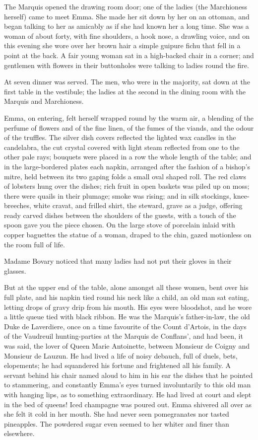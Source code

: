 \documentclass[11pt,twocolumn]{ltugboat}
\begin{document}
The Marquis opened the drawing room door; one of the ladies (the
Marchioness herself) came to meet Emma. She made her sit down by her on
an ottoman, and began talking to her as amicably as if she had known her
a long time. She was a woman of about forty, with fine shoulders, a hook
nose, a drawling voice, and on this evening she wore over her brown hair
a simple guipure fichu that fell in a point at the back. A fair young
woman sat in a high-backed chair in a corner; and gentlemen with flowers
in their buttonholes were talking to ladies round the fire.

At seven dinner was served. The men, who were in the majority, sat down
at the first table in the vestibule; the ladies at the second in the
dining room with the Marquis and Marchioness.

Emma, on entering, felt herself wrapped round by the warm air, a
blending of the perfume of flowers and of the fine linen, of the fumes
of the viands, and the odour of the truffles. The silver dish covers
reflected the lighted wax candles in the candelabra, the cut crystal
covered with light steam reflected from one to the other pale rays;
bouquets were placed in a row the whole length of the table; and in
the large-bordered plates each napkin, arranged after the fashion of a
bishop's mitre, held between its two gaping folds a small oval shaped
roll. The red claws of lobsters hung over the dishes; rich fruit in open
baskets was piled up on moss; there were quails in their plumage; smoke
was rising; and in silk stockings, knee-breeches, white cravat, and
frilled shirt, the steward, grave as a judge, offering ready carved
dishes between the shoulders of the guests, with a touch of the spoon
gave you the piece chosen. On the large stove of porcelain inlaid
with copper baguettes the statue of a woman, draped to the chin, gazed
motionless on the room full of life.

Madame Bovary noticed that many ladies had not put their gloves in their
glasses.

But at the upper end of the table, alone amongst all these women, bent
over his full plate, and his napkin tied round his neck like a child, an
old man sat eating, letting drops of gravy drip from his mouth. His eyes
were bloodshot, and he wore a little queue tied with black ribbon. He
was the Marquis's father-in-law, the old Duke de Laverdiere, once on
a time favourite of the Count d'Artois, in the days of the Vaudreuil
hunting-parties at the Marquis de Conflans', and had been, it was said,
the lover of Queen Marie Antoinette, between Monsieur de Coigny and
Monsieur de Lauzun. He had lived a life of noisy debauch, full of duels,
bets, elopements; he had squandered his fortune and frightened all his
family. A servant behind his chair named aloud to him in his ear the
dishes that he pointed to stammering, and constantly Emma's eyes
turned involuntarily to this old man with hanging lips, as to something
extraordinary. He had lived at court and slept in the bed of queens!
Iced champagne was poured out. Emma shivered all over as she felt
it cold in her mouth. She had never seen pomegranates nor tasted
pineapples. The powdered sugar even seemed to her whiter and finer than
elsewhere.
\end{document}
